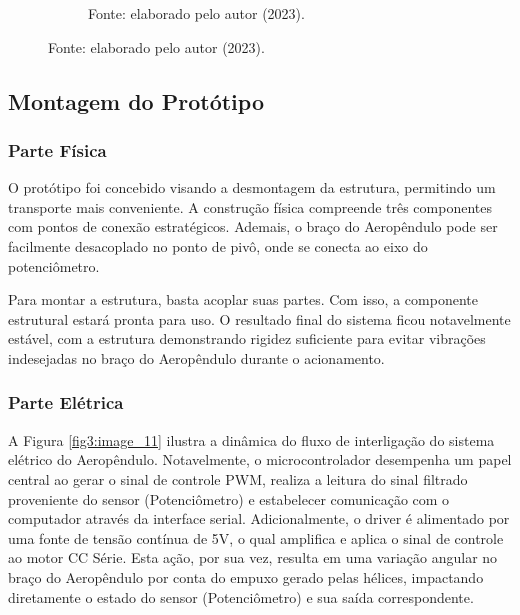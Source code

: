 \begin{figure}[!h]
\begin{subfigure}[b]{0.48\textwidth}
         \caption*{Fonte: elaborado pelo autor (2023).}
         \label{fig3:image_10}
     \end{subfigure}
\end{figure}


\subsection{Montagem do Protótipo}

\subsubsection{Parte Física}

O protótipo foi concebido visando a desmontagem da estrutura, permitindo um transporte mais conveniente. A construção física compreende três componentes com pontos de conexão estratégicos. Ademais, o braço do Aeropêndulo pode ser facilmente desacoplado no ponto de pivô, onde se conecta ao eixo do potenciômetro.

Para montar a estrutura, basta acoplar suas partes. Com isso, a componente estrutural estará pronta para uso. O resultado final do sistema ficou notavelmente estável, com a estrutura demonstrando rigidez suficiente para evitar vibrações indesejadas no braço do Aeropêndulo durante o acionamento.

\subsubsection{Parte Elétrica}


A Figura \ref{fig3:image_11} ilustra a dinâmica do fluxo de interligação do sistema elétrico do Aeropêndulo. Notavelmente, o microcontrolador desempenha um papel central ao gerar o sinal de controle PWM, realiza a leitura do sinal filtrado proveniente do sensor (Potenciômetro) e estabelecer comunicação com o computador através da interface serial. Adicionalmente, o driver é alimentado por uma fonte de tensão contínua de 5V, o qual amplifica e aplica o sinal de controle ao motor CC Série. Esta ação, por sua vez, resulta em uma variação angular no braço do Aeropêndulo por conta do empuxo gerado pelas hélices, impactando diretamente o estado do sensor (Potenciômetro) e sua saída correspondente.


